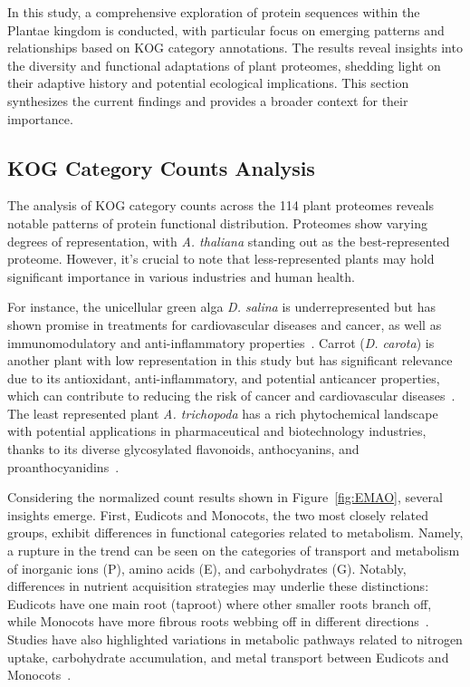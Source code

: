 In this study, a comprehensive exploration of protein 
sequences within the Plantae kingdom is conducted, with 
particular focus on emerging patterns and relationships 
based on KOG category annotations. The results reveal 
insights into the diversity and functional adaptations of 
plant proteomes, shedding light on their adaptive history 
and potential ecological implications. This section 
synthesizes the current findings and provides a broader 
context for their importance.


\subsection{KOG Category Counts Analysis}
\label{sec:conclusion.kogcount}

The analysis of KOG category counts across the 114 plant 
proteomes reveals notable patterns of protein functional 
distribution. Proteomes show varying degrees of 
representation, with \emph{A. thaliana} standing out as 
the best-represented proteome. However, it's crucial to 
note that less-represented plants may hold significant 
importance in various industries and human health. 

For instance, the unicellular green 
alga \emph{D. salina} is underrepresented but has shown 
promise in treatments for cardiovascular diseases and 
cancer, as well as immunomodulatory and anti-inflammatory 
properties~\citep{hyrslova2022}. 
Carrot (\emph{D. carota}) is another plant 
with low representation in this study but has significant 
relevance due to its antioxidant, anti-inflammatory, and 
potential anticancer properties, which can contribute to 
reducing the risk of cancer and cardiovascular 
diseases~\citep{ahmad2019}. The 
least represented plant \emph{A. trichopoda} has a rich 
phytochemical landscape with potential applications in 
pharmaceutical and biotechnology industries, thanks to 
its diverse glycosylated flavonoids, anthocyanins, and 
proanthocyanidins~\citep{wu2019}. 

Considering the normalized count results shown in 
Figure~\ref{fig:EMAO}, several insights emerge.
First, Eudicots and Monocots, the two most closely 
related groups, exhibit differences in functional 
categories related to metabolism. Namely, a rupture 
in the trend can be seen on 
the categories of transport and metabolism of inorganic ions 
(P), amino acids (E), and carbohydrates (G). Notably, 
differences in nutrient acquisition strategies may 
underlie these distinctions: Eudicots have one main root 
(taproot) where other smaller roots branch off, while 
Monocots have more fibrous roots webbing off in different 
directions~\citep{freschet2021}. Studies have also highlighted 
variations in metabolic pathways related to nitrogen uptake, 
carbohydrate accumulation, and metal transport between 
Eudicots and Monocots~\citep{yang2020,tian2016}.

